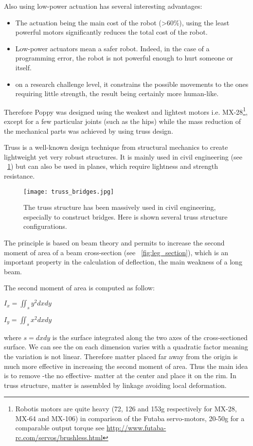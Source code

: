 Also using low-power actuation has several interesting advantages:

\begin{itemize}
    \item The actuation being the main cost of the robot (>60\%), using the least powerful motors significantly reduces the total cost of the robot.
    \item Low-power actuators mean a safer robot. Indeed, in the case of a programming error, the robot is not powerful enough to hurt someone or itself.
    \item on a research challenge level, it constrains the possible movements to the ones requiring little strength, the result being certainly more human-like.
\end{itemize}

Therefore Poppy was designed using the weakest and lightest motors i.e. MX-28\footnote{Robotis motors are quite heavy (72, 126 and 153g respectively for MX-28, MX-64 and MX-106) in comparison of the Futaba servo-motors, 20-50g for a comparable output torque see \url{http://www.futaba-rc.com/servos/brushless.html}}, except for a few particular joints (such as the hips) while the mass reduction of the mechanical parts was achieved by using truss design.

Truss is a well-known design technique from structural mechanics to create lightweight yet very robust structures. It is mainly used in civil engineering (see \figurename~\ref{fig:truss_bridges}) but can also be used in planes, which require lightness and strength resistance.

\begin{figure}[tb]
    \begin{center}
        \texttt{[image: truss\_bridges.jpg]}
    \end{center}
    \caption{The truss structure has been massively used in civil engineering, especially to construct bridges. Here is shown several truss structure configurations.}
    \label{fig:truss_bridges}
\end{figure}


The principle is based on beam theory and permits to increase the second moment of area of a beam cross-section (see \figurename~\ref{fig:leg_section}), which is an important property in the calculation of deflection, the main weakness of a long beam.

The second moment of area is computed as follow:
\begin{center}
    $I_x = \iint_s y^2 dxdy$

    $I_y = \iint_s x^2 dxdy$
\end{center}
where $s = dxdy$ is the surface integrated along the two axes of the cross-sectioned surface. We can see the  on each dimension varies with a quadratic factor meaning the variation is not linear. Therefore matter placed far away from the origin is much more effective in increasing the second moment of area.
Thus the main idea is to remove -the no effective- matter at the center and place it on the rim. In truss structure, matter is assembled by linkage avoiding local deformation.

